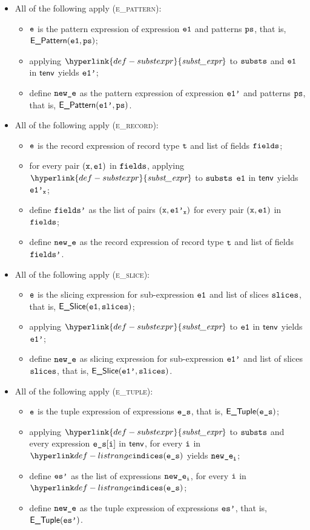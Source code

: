 \documentclass{book}
\newcommand\substexpr[0]{\hyperlink{def-substexpr}{\textfunc{subst\_expr}}}
\begin{document}
\begin{itemize}
  \item All of the following apply (\textsc{e\_pattern}):
  \begin{itemize}
    \item $\texttt{e}$ is the pattern expression of expression $\texttt{e1}$ and patterns $\texttt{ps}$, that is, \\
          $\textsf{E\_Pattern}(\texttt{e1}, \texttt{ps})$;
    \item applying $\substexpr$ to $\texttt{substs}$ and $\texttt{e1}$ in $\textsf{tenv}$ yields $\texttt{e1'}$;
    \item define $\texttt{new\_e}$ as the pattern expression of expression $\texttt{e1'}$ and patterns $\texttt{ps}$, that is, $\textsf{E\_Pattern}(\texttt{e1'}, \texttt{ps})$.
  \end{itemize}

  \item All of the following apply (\textsc{e\_record}):
  \begin{itemize}
    \item $\texttt{e}$ is the record expression of record type $\texttt{t}$ and list of fields $\texttt{fields}$;
    \item for every pair $(\texttt{x},\texttt{e1})$ in $\texttt{fields}$, applying $\substexpr$ to $\texttt{substs}$ $\texttt{e1}$ in $\textsf{tenv}$ yields $\texttt{e1'}_{\texttt{x}}$;
    \item define $\texttt{fields'}$ as the list of pairs $(\texttt{x},\texttt{e1'}_{\texttt{x}})$ for every pair $(\texttt{x},\texttt{e1})$ in $\texttt{fields}$;
    \item define $\texttt{new\_e}$ as the record expression of record type $\texttt{t}$ and list of fields $\texttt{fields'}$.
  \end{itemize}

  \item All of the following apply (\textsc{e\_slice}):
  \begin{itemize}
    \item $\texttt{e}$ is the slicing expression for sub-expression $\texttt{e1}$ and list of slices $\texttt{slices}$, that is, $\textsf{E\_Slice}(\texttt{e1}, \texttt{slices})$;
    \item applying $\substexpr$ to $\texttt{e1}$ in $\textsf{tenv}$ yields $\texttt{e1'}$;
    \item define $\texttt{new\_e}$ as slicing expression for sub-expression $\texttt{e1'}$ and list of slices $\texttt{slices}$, that is, $\textsf{E\_Slice}(\texttt{e1'}, \texttt{slices})$.
  \end{itemize}

  \item All of the following apply (\textsc{e\_tuple}):
  \begin{itemize}
    \item $\texttt{e}$ is the tuple expression of expressions $\texttt{e\_s}$, that is, $\textsf{E\_Tuple}(\texttt{e\_s})$;
    \item applying $\substexpr$ to $\texttt{substs}$ and every expression $\texttt{e\_s}[\texttt{i}]$ in $\textsf{tenv}$, for every $\texttt{i}$ in $\listrange(\ves)$
          yields $\texttt{new\_e}_{\texttt{i}}$;
    \item define $\texttt{es'}$ as the list of expressions $\texttt{new\_e}_{\texttt{i}}$, for every $\texttt{i}$ in $\listrange(\ves)$;
    \item define $\texttt{new\_e}$ as the tuple expression of expressions $\texttt{es'}$, that is, $\textsf{E\_Tuple}(\texttt{es'})$.
  \end{itemize}


\end{itemize}
\end{document}
